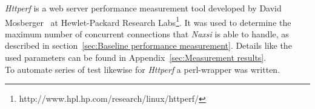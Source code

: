 \emph{Httperf} is a web server performance measurement tool developed by David Mosberger~\cite{mosberger1998httperf} at Hewlet-Packard Research Labs\footnote{http://www.hpl.hp.com/research/linux/httperf/}. It was used to determine the maximum number of concurrent connections that \emph{Naxsi} is able to handle, as described in section~\ref{sec:Baseline performance measurement}. Details like the used parameters can be found in Appendix~\ref{sec:Measurement results}.\\
To automate series of test likewise for \emph{Httperf} a perl-wrapper was written.
